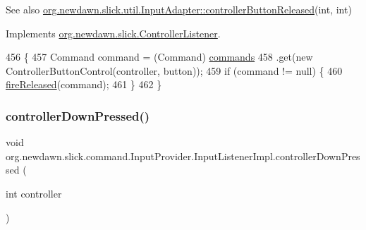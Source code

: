 \begin{DoxySeeAlso}{See also}
\mbox{\hyperlink{classorg_1_1newdawn_1_1slick_1_1util_1_1_input_adapter_ab67126cbafdf4803d88270e945553019}{org.\+newdawn.\+slick.\+util.\+Input\+Adapter\+::controller\+Button\+Released}}(int, int) 
\end{DoxySeeAlso}


Implements \mbox{\hyperlink{interfaceorg_1_1newdawn_1_1slick_1_1_controller_listener_a34020453a6c40e12b149c334a4adc246}{org.\+newdawn.\+slick.\+Controller\+Listener}}.


\begin{DoxyCode}
456                                                                          \{
457             Command command = (Command) \mbox{\hyperlink{classorg_1_1newdawn_1_1slick_1_1command_1_1_input_provider_ab2bd0c08506a59bc7457d7a87cf873d2}{commands}}
458                     .\textcolor{keyword}{get}(\textcolor{keyword}{new} ControllerButtonControl(controller, button));
459             \textcolor{keywordflow}{if} (command != null) \{
460                 \mbox{\hyperlink{classorg_1_1newdawn_1_1slick_1_1command_1_1_input_provider_afede03e3ab95cb0248635cf64de6874c}{fireReleased}}(command);
461             \}
462         \}
\end{DoxyCode}
\mbox{\label{classorg_1_1newdawn_1_1slick_1_1command_1_1_input_provider_1_1_input_listener_impl_a80dbef3f0eaed865ae1ef23b406cea40}} 
\subsubsection{\texorpdfstring{controller\+Down\+Pressed()}{controllerDownPressed()}}
{\footnotesize\ttfamily void org.\+newdawn.\+slick.\+command.\+Input\+Provider.\+Input\+Listener\+Impl.\+controller\+Down\+Pressed (\begin{DoxyParamCaption}\item[{int}]{controller }\end{DoxyParamCaption})\hspace{0.3cm}{\ttfamily [inline]}}

